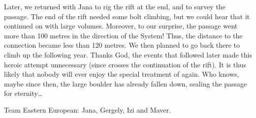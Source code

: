Later, we returned with Jana to rig the rift at the end, and to survey
the passage. The end of the rift needed some bolt climbing, but we could
hear that it continued on with large volumes. Moreover, to our surprise,
the passage went more than 100 metres in the direction of the System!
Thus, the distance to the connection became less than 120 metres. We
then planned to go back there to climb up the following year. Thanks
God, the events that followed later made this heroic attempt unnecessary
(since 
crosses the continuation of the rift). It is thus likely that nobody
will ever enjoy the special treatment of  again. Who
knows, maybe since then, the large boulder has already fallen down,
sealing the passage for eternity\ldots{}




    \begin{pagefigure}
\checkoddpage \ifoddpage \forcerectofloat \else \forceversofloat \fi
    \centering
        \caption{Team Eastern European: Jana, Gergely, Izi and Maver. } \label{eastern european quartet}
    \end{pagefigure}

